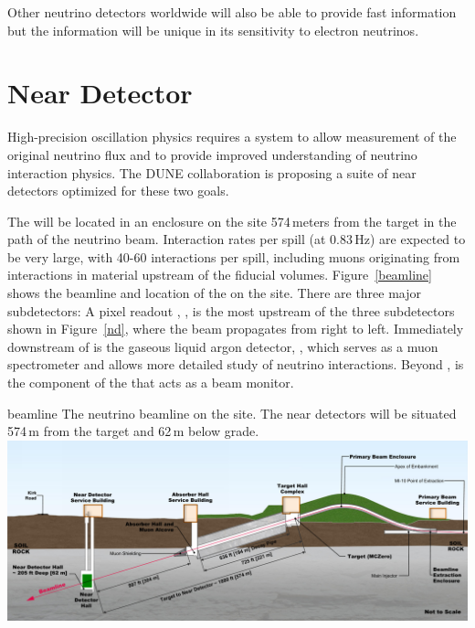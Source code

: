 \documentclass[../main-v1.tex]{subfiles}
\begin{document}
Other neutrino detectors worldwide will also be able to provide fast information but the  information will be unique in its sensitivity to electron neutrinos. 







\section{Near Detector }

High-precision oscillation physics requires a  system to allow measurement of the original neutrino flux and %
to provide improved understanding of neutrino interaction physics. 
The DUNE  collaboration is proposing a suite of near detectors optimized for these two goals. 
 
 The   will be located in an enclosure on the  site 574\,meters from the target %
 in the path of the neutrino beam.    Interaction rates per spill (at 0.83\,Hz) are expected to be very large, with 40-60 interactions per spill, including muons originating from interactions in material upstream of the fiducial volumes. Figure~\ref{beamline} shows the beamline and location of the  on the  site. There are three major subdetectors:
 A pixel readout %
 , , is  the most upstream of the three subdetectors shown in Figure~\ref{nd}, where the beam propagates  from right to left. Immediately downstream of  is the gaseous liquid argon detector, , which serves %
 as  a muon spectrometer and allows more detailed study of neutrino interactions. %
 Beyond , is the  component of the  that acts as a beam monitor. %
 

 \begin{dunefigure}
{beamline} %
{The neutrino beamline on the  site. The near detectors will be situated 574\,m from the target and 62\,m below grade.}
\includegraphics[height=0.3\textwidth]{graphics/IntroFigures/beamline-sideview.png}
\end{dunefigure}
\end{document}
